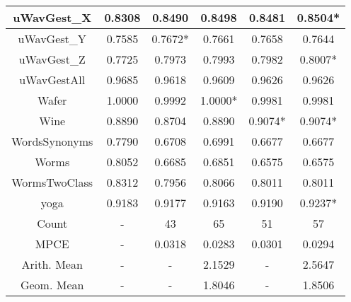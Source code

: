 \documentclass[article]{IEEEtran}
\begin{document}
\begin{table}[]
\begin{adjustbox}{width=1 \linewidth}
\begin{tabularx}{0.62 \textwidth}{|C|C|C|C|C|C|}
    \hline
    uWavGest\_X & 0.8308 & 0.8490 & 0.8498 & 0.8481 & 0.8504* \\
    \hline
    uWavGest\_Y & 0.7585 & 0.7672* & 0.7661 & 0.7658 & 0.7644 \\
    \hline
    uWavGest\_Z & 0.7725 & 0.7973 & 0.7993 & 0.7982 & 0.8007* \\
    \hline
    uWavGestAll & 0.9685 & 0.9618 & 0.9609 & 0.9626 & 0.9626 \\
    \hline
    Wafer & 1.0000 & 0.9992 & 1.0000* & 0.9981 & 0.9981 \\
    \hline
    Wine  & 0.8890 & 0.8704 & 0.8890 & 0.9074* & 0.9074* \\
    \hline
    WordsSynonyms & 0.7790 & 0.6708 & 0.6991 & 0.6677 & 0.6677 \\
    \hline
    Worms & 0.8052 & 0.6685 & 0.6851 & 0.6575 & 0.6575 \\
    \hline
    WormsTwoClass & 0.8312 & 0.7956 & 0.8066 & 0.8011 & 0.8011 \\
    \hline
    yoga  & 0.9183 & 0.9177 & 0.9163 & 0.9190 & 0.9237* \\
    \hline
    Count & -     & 43 & 65 & 51 & 57 \\
    \hline
    MPCE  & -     & 0.0318 & 0.0283 & 0.0301 & 0.0294 \\
    \hline
    Arith. Mean & -     & -     & 2.1529 & -     & 2.5647 \\
    \hline
    Geom. Mean & -     & -     & 1.8046 & -     & 1.8506 \\
    \hline


    \end{tabularx}\end{adjustbox}
  \label{tab:addlabel}

\end{table}%
\end{document}
